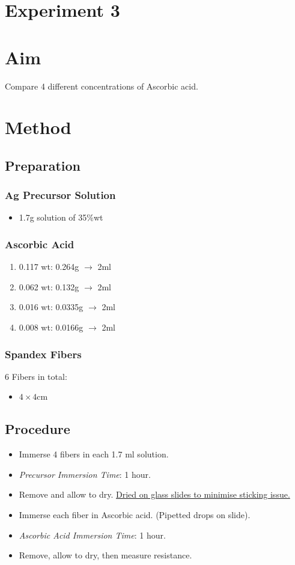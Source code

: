 \documentclass{article}
\begin{document}
\section*{Experiment 3}

\section{Aim}
Compare 4 different concentrations of Ascorbic acid. 

\section{Method}
\subsection{Preparation}
\subsubsection{Ag Precursor Solution}
\begin{itemize}
    \item 1.7g solution of  35\%wt
\end{itemize}

\subsubsection{Ascorbic Acid}
\begin{enumerate}
    \item 0.117 wt: 0.264g $\rightarrow$  2ml
    \item 0.062 wt: 0.132g $\rightarrow$  2ml
    \item 0.016 wt: 0.0335g $\rightarrow$  2ml
    \item 0.008 wt: 0.0166g $\rightarrow$  2ml
\end{enumerate}

\subsubsection{Spandex Fibers}
6 Fibers in total:
\begin{itemize}
    \item $4\times 4$cm
\end{itemize}

\subsection{Procedure}
\begin{itemize}
    \item Immerse 4 fibers in each 1.7 ml solution.
    \item \textit{Precursor Immersion Time}: 1 hour.
    \item Remove and allow to dry. \underline{Dried on glass slides to minimise sticking issue.}
    \item Immerse each fiber in Ascorbic acid. (Pipetted drops on slide).
    \item \textit{Ascorbic Acid Immersion Time}: 1 hour.
    \item Remove, allow to dry, then measure resistance.
\end{itemize}
\end{document}
